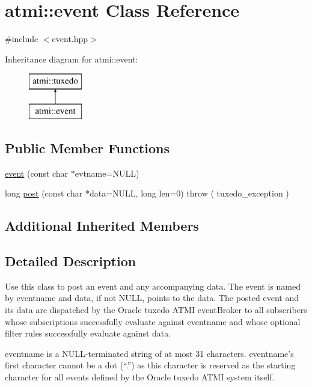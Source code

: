 \hypertarget{classatmi_1_1event}{}\section{atmi\+:\+:event Class Reference}
\label{classatmi_1_1event}


{\ttfamily \#include $<$event.\+hpp$>$}

Inheritance diagram for atmi\+:\+:event\+:\begin{figure}[H]
\begin{center}
\leavevmode
\includegraphics[height=2.000000cm]{classatmi_1_1event}
\end{center}
\end{figure}
\subsection*{Public Member Functions}
\begin{DoxyCompactItemize}
\item 
\hyperlink{classatmi_1_1event_a64e8905f6b027d052074cb801567b1b3}{event} (const char $\ast$evtname=N\+U\+LL)
\item 
long \hyperlink{classatmi_1_1event_a0b1f1faae17aa923ce5a4a0d45cfcd07}{post} (const char $\ast$data=N\+U\+LL, long len=0)  throw ( tuxedo\+\_\+exception )
\end{DoxyCompactItemize}
\subsection*{Additional Inherited Members}


\subsection{Detailed Description}
Use this class to post an event and any accompanying data. The event is named by eventname and data, if not N\+U\+LL, points to the data. The posted event and its data are dispatched by the Oracle tuxedo A\+T\+MI event\+Broker to all subscribers whose subscriptions successfully evaluate against eventname and whose optional filter rules successfully evaluate against data.

eventname is a N\+U\+L\+L-\/terminated string of at most 31 characters. eventname’s first character cannot be a dot (“.\+”) as this character is reserved as the starting character for all events defined by the Oracle tuxedo A\+T\+MI system itself.

